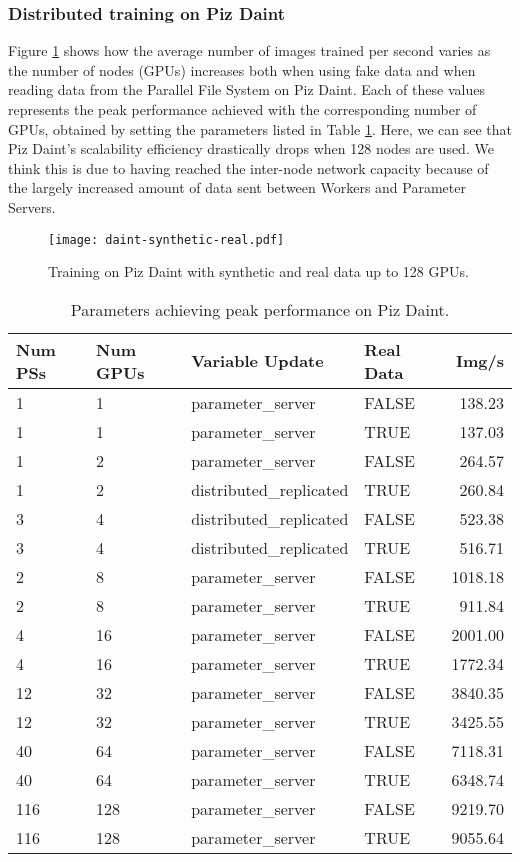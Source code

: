 \subsubsection{Distributed training on Piz Daint}
Figure \ref{fig:daint} shows how the average number of images trained per second varies as the number of nodes (GPUs) increases both when using fake data and when reading data from the Parallel File System on Piz Daint.
Each of these values represents the peak performance achieved with the corresponding number of GPUs, obtained by setting the parameters listed in Table \ref{tab:peak-perf-daint}.
Here, we can see that Piz Daint's scalability efficiency drastically drops when 128 nodes are used.
We think this is due to having reached the inter-node network capacity because of the largely increased amount of data sent between Workers and Parameter Servers.
\begin{figure}[H]
  \centering
  \texttt{[image: daint-synthetic-real.pdf]}
  \vspace{-0.85cm}
  \caption{Training on Piz Daint with synthetic and real data up to 128 GPUs.} 
  \label{fig:daint}
\end{figure}
\begin{table}[H]
 \centering
 \begin{tabular}{||l | l | l | l | r||} 
 \hline
 \textbf{Num PSs} & \textbf{Num GPUs} & \textbf{Variable Update} & \textbf{Real Data} & \textbf{Img/s}\\ [0.5ex] 
 \hline\hline
 1 & 1 & parameter\_server & FALSE & 138.23\\\hline
 1 & 1 & parameter\_server & TRUE & 137.03\\\hline
 1 & 2 & parameter\_server & FALSE & 264.57\\\hline
 1 & 2 & distributed\_replicated & TRUE & 260.84\\\hline
 3 & 4 & distributed\_replicated & FALSE & 523.38\\\hline
 3 & 4 & distributed\_replicated & TRUE & 516.71\\\hline
 2 & 8 & parameter\_server & FALSE & 1018.18\\\hline
 2 & 8 & parameter\_server & TRUE & 911.84\\\hline
 4 & 16 & parameter\_server & FALSE & 2001.00\\\hline
 4 & 16 & parameter\_server & TRUE & 1772.34\\\hline
 12 & 32 & parameter\_server & FALSE & 3840.35\\\hline
 12 & 32 & parameter\_server & TRUE & 3425.55\\\hline
 40 & 64 & parameter\_server & FALSE & 7118.31\\\hline
 40 & 64 & parameter\_server & TRUE & 6348.74\\\hline
 116 & 128 & parameter\_server & FALSE & 9219.70\\\hline
 116 & 128 & parameter\_server & TRUE & 9055.64\\\hline
\end{tabular}
\caption{Parameters achieving peak performance on Piz Daint.}
\label{tab:peak-perf-daint}
\end{table}


